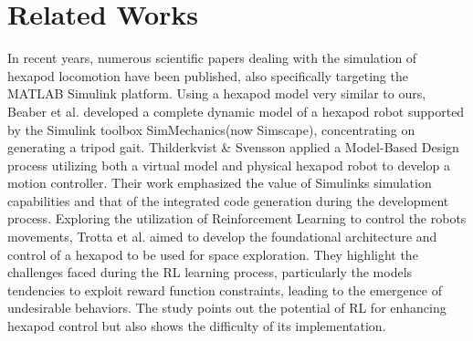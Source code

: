 %

\section{Related Works}
In recent years, numerous scientific papers dealing with the simulation of hexapod locomotion have been published, also specifically targeting the MATLAB Simulink platform.
Using a hexapod model very similar to ours, Beaber et al. \parencite{beaber2018dynamic} developed a complete dynamic model of a hexapod robot supported by the Simulink toolbox SimMechanics(now Simscape), concentrating on generating a tripod gait.
Thilderkvist \& Svensson \Parencite{thilderkvist2015motion} applied a Model-Based Design process utilizing both a virtual model and physical hexapod robot to develop a motion controller.
Their work emphasized the value of Simulinks simulation capabilities and that of the integrated code generation during the development process.
Exploring the utilization of Reinforcement Learning to control the robots movements, Trotta et al. \parencite{trotta2022walking} aimed to develop the foundational architecture and control of a hexapod to be used for space exploration.
They highlight the challenges faced during the RL learning process, particularly the models tendencies to exploit reward function constraints, leading to the emergence of undesirable behaviors.
The study points out the potential of RL for enhancing hexapod control but also shows the difficulty of its implementation.
 


%


